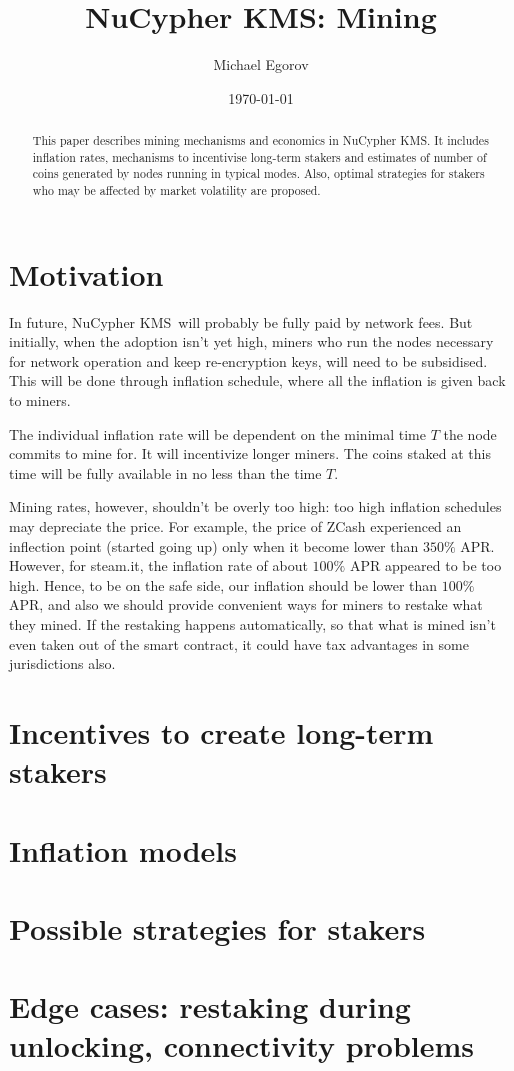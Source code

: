 \documentclass[longbibliography,nofootinbib,twocolumn]{revtex4-1}
\newcommand{\kms}{NuCypher KMS}
\begin{document}
\title{\kms: Mining}

\author{Michael Egorov}

\begin{abstract}
    This paper describes mining mechanisms and economics in \kms.
    It includes inflation rates, mechanisms to incentivise long-term stakers
    and estimates of number of coins generated by nodes running in typical modes.
    Also, optimal strategies for stakers who may be affected by market volatility are proposed.
\end{abstract}

\date{\today}
\maketitle

\section{Motivation}

In future, \kms~will probably be fully paid by network fees.
But initially, when the adoption isn't yet high, miners who run the nodes necessary for network operation and keep re-encryption keys,
will need to be subsidised.
This will be done through inflation schedule, where all the inflation is given back to miners.

The individual inflation rate will be dependent on the minimal time $T$ the node commits to mine for.
It will incentivize longer miners.
The coins staked at this time will be fully available in no less than the time $T$.

Mining rates, however, shouldn't be overly too high: too high inflation schedules may depreciate the price.
For example, the price of ZCash experienced an inflection point (started going up) only when it become lower than $350\%$ APR.
However, for steam.it, the inflation rate of about $100\%$ APR appeared to be too high.
Hence, to be on the safe side, our inflation should be lower than $100\%$ APR, and also we should provide convenient ways for miners to restake what they
mined.
If the restaking happens automatically, so that what is mined isn't even taken out of the smart contract, it could have tax advantages in some jurisdictions
also.

\section{Incentives to create long-term stakers}

\section{Inflation models}

\section{Possible strategies for stakers}

\section{Edge cases: restaking during unlocking, connectivity problems}
\end{document}
